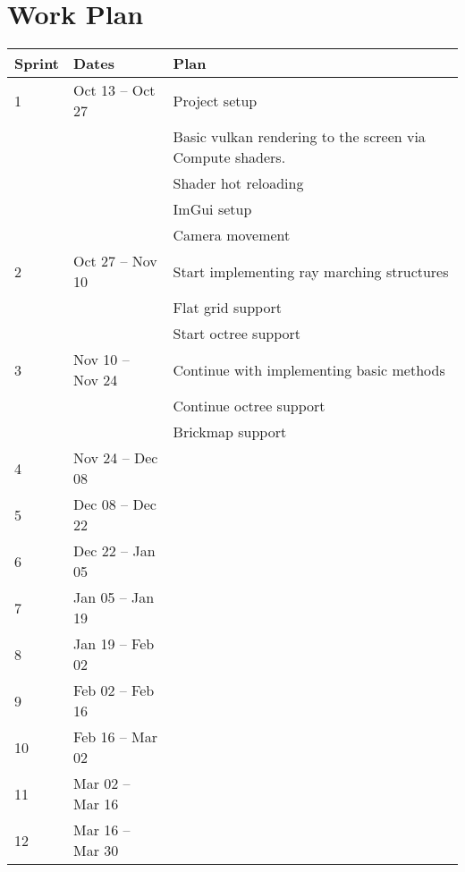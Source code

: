 \section*{Work Plan}






\begin{tabular}{lll}
  Sprint & Dates & Plan \\
  \hline
  1 & Oct 13 -- Oct 27 & Project setup \\
  && Basic vulkan rendering to the screen via Compute shaders. \\
  && Shader hot reloading \\
  && ImGui setup \\
  && Camera movement \\
  \hline
  2 & Oct 27 -- Nov 10 & Start implementing ray marching structures \\
  && Flat grid support \\
  && Start octree support \\
  \hline
  3 & Nov 10 -- Nov 24 & Continue with implementing basic methods \\
  && Continue octree support \\
  && Brickmap support \\
  \hline
  4 & Nov 24 -- Dec 08 & \\
  \hline
  5 & Dec 08 -- Dec 22 & \\
  \hline
  6 & Dec 22 -- Jan 05 & \\
  \hline
  7 & Jan 05 -- Jan 19 & \\
  \hline
  8 & Jan 19 -- Feb 02 & \\
  \hline
  9 & Feb 02 -- Feb 16 & \\
  \hline
  10 & Feb 16 -- Mar 02 & \\
  \hline
  11 & Mar 02 -- Mar 16 & \\
  \hline
  12 & Mar 16 -- Mar 30 & \\
  \hline

\end{tabular}
